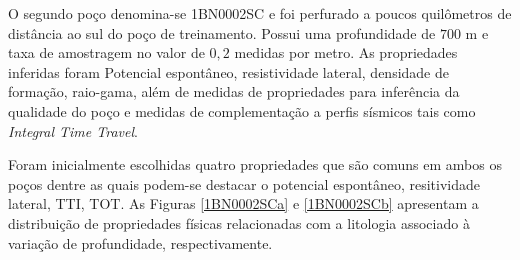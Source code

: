 O segundo poço denomina-se 1BN0002SC e foi perfurado a poucos quilômetros de distância ao sul do poço de treinamento. Possui uma profundidade de $700$ m e taxa de amostragem no valor de $0,2$ medidas por metro. As propriedades inferidas foram Potencial espontâneo, resistividade lateral, densidade de formação, raio-gama, além de medidas de propriedades para inferência da qualidade do poço e medidas de complementação a perfis sísmicos tais como \textit{Integral Time Travel}. 

Foram inicialmente escolhidas quatro propriedades que são comuns em ambos os poços dentre as quais podem-se destacar o potencial espontâneo, resitividade lateral, TTI, TOT. As Figuras \ref{1BN0002SCa} e \ref{1BN0002SCb} apresentam a distribuição de propriedades físicas relacionadas com a litologia associado à variação de profundidade, respectivamente. 



